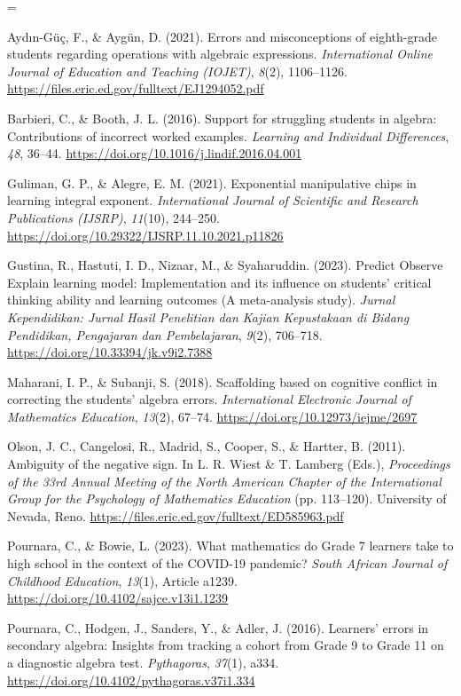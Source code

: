 \documentclass[a4paper,12pt]{article}
\begin{document}
{\TimesEn\linespread{1.0}\fontsize{10.8pt}{16.2pt}\selectfont
\setlength{\parskip}{3.2pt}
\everypar={\hangindent=0.85cm }

Aydın-Güç, F., \& Aygün, D. (2021). Errors and misconceptions of eighth-grade students regarding operations with algebraic expressions. \textit{International Online Journal of Education and Teaching (IOJET)}, \textit{8}(2), 1106--1126. \url{https://files.eric.ed.gov/fulltext/EJ1294052.pdf}

Barbieri, C., \& Booth, J. L. (2016). Support for struggling students in algebra: Contributions of incorrect worked examples. \textit{Learning and Individual Differences}, \textit{48}, 36--44. \url{https://doi.org/10.1016/j.lindif.2016.04.001}

Guliman, G. P., \& Alegre, E. M. (2021). Exponential manipulative chips in learning integral exponent. \textit{International Journal of Scientific and Research Publications (IJSRP)}, \textit{11}(10), 244--250. \url{https://doi.org/10.29322/IJSRP.11.10.2021.p11826}

Gustina, R., Hastuti, I. D., Nizaar, M., \& Syaharuddin. (2023). Predict Observe Explain learning model: Implementation and its influence on students' critical thinking ability and learning outcomes (A meta-analysis study). \textit{Jurnal Kependidikan: Jurnal Hasil Penelitian dan Kajian Kepustakaan di Bidang Pendidikan, Pengajaran dan Pembelajaran}, \textit{9}(2), 706--718. \url{https://doi.org/10.33394/jk.v9i2.7388}

Maharani, I. P., \& Subanji, S. (2018). Scaffolding based on cognitive conflict in correcting the students' algebra errors. \textit{International Electronic Journal of Mathematics Education}, \textit{13}(2), 67--74. \url{https://doi.org/10.12973/iejme/2697}

Olson, J. C., Cangelosi, R., Madrid, S., Cooper, S., \& Hartter, B. (2011). Ambiguity of the negative sign. In L. R. Wiest \& T. Lamberg (Eds.), \textit{Proceedings of the 33rd Annual Meeting of the North American Chapter of the International Group for the Psychology of Mathematics Education} (pp. 113--120). University of Nevada, Reno. \url{https://files.eric.ed.gov/fulltext/ED585963.pdf}

Pournara, C., \& Bowie, L. (2023). What mathematics do Grade 7 learners take to high school in the context of the COVID-19 pandemic? \textit{South African Journal of Childhood Education}, \textit{13}(1), Article a1239. \url{https://doi.org/10.4102/sajce.v13i1.1239}

Pournara, C., Hodgen, J., Sanders, Y., \& Adler, J. (2016). Learners' errors in secondary algebra: Insights from tracking a cohort from Grade 9 to Grade 11 on a diagnostic algebra test. \textit{Pythagoras}, \textit{37}(1), a334. \url{https://doi.org/10.4102/pythagoras.v37i1.334}

}
\end{document}
